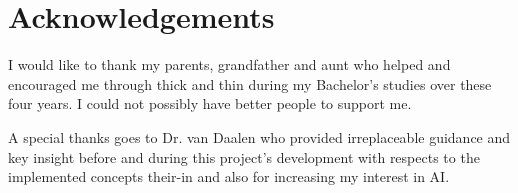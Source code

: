 \chapter{Acknowledgements}

I would like to thank my parents, grandfather and aunt who helped and encouraged me through thick and thin during my Bachelor's studies over these four years. I could not possibly have better people to support me.

A special thanks goes to Dr. van Daalen who provided irreplaceable guidance and key insight before and during this project's development with respects to the implemented concepts their-in and also for increasing my interest in AI.